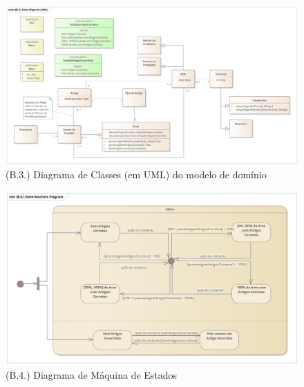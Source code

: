 \documentclass[12pt,a4paper]{article}
\begin{document}
\begin{landscape}
  \begin{figure}
    \centering
    \includegraphics[width=1.6\textwidth]{assets/ea-uml.png}
    \caption{(B.3.) Diagrama de Classes (em UML) do modelo de domínio}
    \label{fig:uml}
  \end{figure}
\end{landscape}

\begin{landscape}
  \begin{figure}
    \centering
    \includegraphics[width=1.6\textwidth]{assets/ea-state-machine.png}
    \caption{(B.4.) Diagrama de Máquina de Estados}
    \label{fig:state-machine}
  \end{figure}
\end{landscape}
\end{document}
